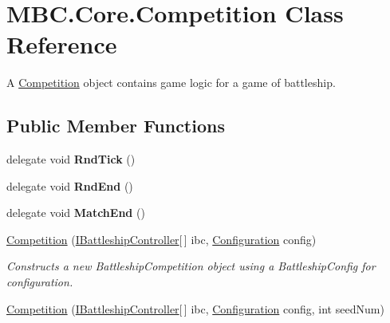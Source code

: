 \hypertarget{class_m_b_c_1_1_core_1_1_competition}{\section{M\-B\-C.\-Core.\-Competition Class Reference}
\label{class_m_b_c_1_1_core_1_1_competition}
}


A \hyperlink{class_m_b_c_1_1_core_1_1_competition}{Competition} object contains game logic for a game of battleship.  


\subsection*{Public Member Functions}
\begin{DoxyCompactItemize}
\item 
\hypertarget{class_m_b_c_1_1_core_1_1_competition_acfa9bb4b8a178d9981e5d4687d1487b2}{delegate void {\bfseries Rnd\-Tick} ()}\label{class_m_b_c_1_1_core_1_1_competition_acfa9bb4b8a178d9981e5d4687d1487b2}

\item 
\hypertarget{class_m_b_c_1_1_core_1_1_competition_a7378a503b4d23466fc27a2bce3ee8a37}{delegate void {\bfseries Rnd\-End} ()}\label{class_m_b_c_1_1_core_1_1_competition_a7378a503b4d23466fc27a2bce3ee8a37}

\item 
\hypertarget{class_m_b_c_1_1_core_1_1_competition_a7eecf4dc6eb7d6e7b3e6bbaf094aa1ac}{delegate void {\bfseries Match\-End} ()}\label{class_m_b_c_1_1_core_1_1_competition_a7eecf4dc6eb7d6e7b3e6bbaf094aa1ac}

\item 
\hypertarget{class_m_b_c_1_1_core_1_1_competition_ae9b5b6e7d2eedcce2956e93cafbca8ff}{\hyperlink{class_m_b_c_1_1_core_1_1_competition_ae9b5b6e7d2eedcce2956e93cafbca8ff}{Competition} (\hyperlink{interface_m_b_c_1_1_core_1_1_i_battleship_controller}{I\-Battleship\-Controller}\mbox{[}$\,$\mbox{]} ibc, \hyperlink{class_m_b_c_1_1_core_1_1_configuration}{Configuration} config)}\label{class_m_b_c_1_1_core_1_1_competition_ae9b5b6e7d2eedcce2956e93cafbca8ff}

\begin{DoxyCompactList}\small\item\em Constructs a new Battleship\-Competition object using a Battleship\-Config for configuration.\end{DoxyCompactList}\item 
\hypertarget{class_m_b_c_1_1_core_1_1_competition_a5613af0d06dd42cd00e13ed2643f88f0}{\hyperlink{class_m_b_c_1_1_core_1_1_competition_a5613af0d06dd42cd00e13ed2643f88f0}{Competition} (\hyperlink{interface_m_b_c_1_1_core_1_1_i_battleship_controller}{I\-Battleship\-Controller}\mbox{[}$\,$\mbox{]} ibc, \hyperlink{class_m_b_c_1_1_core_1_1_configuration}{Configuration} config, int seed\-Num)}\label{class_m_b_c_1_1_core_1_1_competition_a5613af0d06dd42cd00e13ed2643f88f0}


\end{DoxyCompactItemize}
